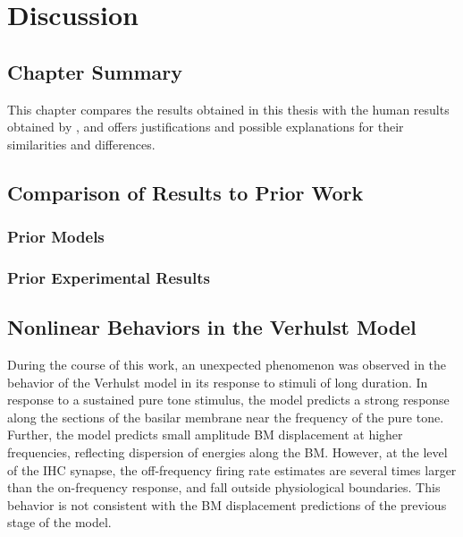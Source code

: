 \chapter{Discussion}
\label{chapter:Discussion}
\thispagestyle{myheadings}

\graphicspath{{6_Discussion/Figures/}}
\section{Chapter Summary} %
\label{sec:discussion_summary}
This chapter compares the results obtained in this thesis with the human results obtained by \citeauthor{Mehraei2016Auditory}, and offers justifications and possible explanations for their similarities and differences.

\section{Comparison of Results to Prior Work} %
\label{sec:comparison_of_results_to_prior_work}
\subsection{Prior Models} %
\label{sub:prior_models}

\subsection{Prior Experimental Results} %
\label{sub:prior_experimental_results}


\section{Nonlinear Behaviors in the Verhulst Model} %
\label{sec:nonlinear_behaviors_in_the_verhulst_model}
During the course of this work, an unexpected phenomenon was observed in the behavior of the Verhulst model in its response to stimuli of long duration.  In response to a sustained pure tone stimulus, the model predicts a strong response along the sections of the basilar membrane near the frequency of the pure tone.  Further, the model predicts small amplitude BM displacement at higher frequencies, reflecting dispersion of energies along the BM.  However, at the level of the IHC synapse, the off-frequency firing rate estimates are several times larger than the on-frequency response, and fall outside physiological boundaries. This behavior is not consistent with the BM displacement predictions of the previous stage of the model.  

